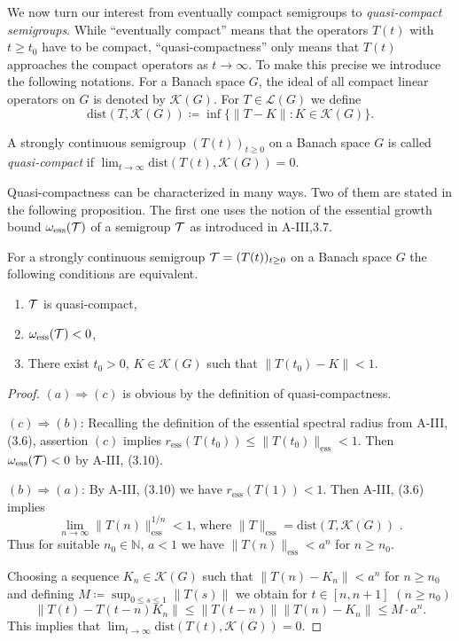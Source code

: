 We now turn our interest from eventually compact semigroups to \emph{quasi-compact semigroups}.
While \enquote{eventually compact} means that the operators $T(t)$ with $t \geq t_{0}$ have to be compact, \enquote{quasi-compactness} only
means that $T(t)$ approaches the compact operators as $t \to \infty$.
To make this precise we introduce the following notations.
For a Banach space $G$, the ideal of all compact linear operators on $G$ is denoted by $\mathcal{K}(G)$.
For $T \in \mathcal{L}(G)$ we define
%
\[
	\text{dist}(T,\mathcal{K}(G))  \coloneq  \inf\{\|T - K\| \colon K \in \mathcal{K}(G)\} .
\]
\begin{definition}\label{def:b4-2.7}
	A strongly continuous semigroup $(T(t))_{t \geq 0}$ on a Banach
	space $G$ is called \emph{quasi-compact} if $\lim_{t\to\infty}\text{dist}(T(t),\mathcal{K}(G)) = 0$.
\end{definition}
Quasi-compactness can be characterized in many ways.
Two of them are stated in the following proposition.
The first one uses the notion of the essential growth bound $\omega_{\text{ess}}(\mathcal{T})$ of a semigroup $\mathcal{T}$ as introduced in A-III,3.7.
\begin{proposition}\label{prop:b4-2.8}
	For a strongly continuous semigroup $\mathcal{T} = (T(t))_{t \geq 0}$
	on a Banach space $G$ the following conditions are equivalent.
	\begin{enumerate}[\upshape (a)]
		\item
		$\mathcal{T}$ is quasi-compact,
	
		\item 
		$\omega_{\text{ess}}(\mathcal{T}) < 0$,
	
		\item 
		There exist $t_{0} > 0$, $K \in \mathcal{K}(G)$ such that $\|T(t_{0}) - K\| < 1$.
	\end{enumerate}
\end{proposition}
\begin{proof}
$(a) \Rightarrow (c)$ is obvious by the definition of quasi-compactness.

$(c) \Rightarrow (b)$: Recalling the definition of the essential spectral radius from A-III, (3.6), assertion $(c)$ implies 
$r_{\text{ess}}(T(t_0)) \leq \|T(t_0)\|_{\text{ess}} < 1 .$ 
Then  $\omega_{\text{ess}}(\mathcal{T}) < 0 $ by A-III, (3.10).

$(b) \Rightarrow (a)$: By A-III, (3.10) we have $r_{\text{ess}}(T(1)) < 1$. Then A-III, (3.6) implies
\[
\text{
$\lim_{n \to \infty}\|T(n)\|_{\text{ess}}^{1/n} < 1$,  where $\|T\|_{\text{ess}} = \mathrm{dist}(T,\mathcal{K}(G))$ .}
\]
Thus for suitable $n_{0} \in \mathbb{N}$, $a < 1$ we have $\|T(n)\|_{\text{ess}} < a^n$ for $n \geq n_{0}$.

Choosing a sequence $K_n \in \mathcal{K}(G)$ such that $\|T(n) - K_n\| < a^n$ for $n \geq n_{0}$ and defining $M \coloneqq \sup_{0 \leq s \leq 1}\|T(s)\|$ we obtain for $t \in [n,n+1]$ $(n \geq n_{0})$ 
\[
\|T(t) - T(t-n)K_n\| \leq \|T(t-n)\|\|T(n) - K_n\| \leq M \cdot a^n .
\] 
This implies that $\lim_{t \to \infty}\mathrm{dist}(T(t),\mathcal{K}(G)) = 0 .$
\end{proof}
